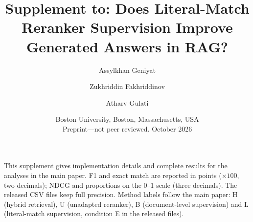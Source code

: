 \documentclass[11pt,a4paper]{article}
\title{Supplement to: Does Literal-Match Reranker Supervision Improve Generated Answers in RAG?}
\author{Assylkhan Geniyat \and Zukhriddin Fakhriddinov \and Atharv Gulati}\date{Boston University, Boston, Massachusetts, USA\\Preprint---not peer reviewed. October 2026}
\begin{document}
\maketitle
\noindent This supplement gives implementation details and complete results for the analyses in the main paper. F1 and exact match are reported in points ($\times100$, two decimals); NDCG and proportions on the 0--1 scale (three decimals). The released CSV files keep full precision. Method labels follow the main paper: H (hybrid retrieval), U (unadapted reranker), B (document-level supervision) and L (literal-match supervision, condition E in the released files).

\setcounter{tocdepth}{1}\tableofcontents
\clearpage



\end{document}
